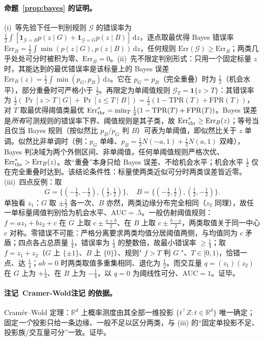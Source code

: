 \documentclass[fontset=windows,11pt]{ctexart}
\newcommand{\R}{\mathbb R}
\newcommand{\dd}{\,\mathrm d}
\numberwithin{equation}{section}
\begin{document}
\paragraph{命题~\ref{prop:bayes} 的证明。}
(i)~等先验下任一判别规则 $\mathcal G$ 的错误率为 $\tfrac12\int[\mathbf1_{\mathcal G=B}p(z\mid G)+\mathbf1_{\mathcal G=G}p(z\mid B)]\dd z$，逐点取最优得 Bayes 错误率 $\mathrm{Err}_B=\tfrac12\int\min(p(z\mid G),p(z\mid B))\dd z$，任何规则 $\mathrm{Err}(\mathcal G)\ge\mathrm{Err}_B$；两类几乎处处可分时被积为零、$\mathrm{Err}_B=0$。(ii)~先不限定判别形式：只用一个固定标量 $z$ 时，其能达到的最优错误率是该标量上的 Bayes 误差 $\mathrm{Err}_B(z)=\tfrac12\int\min(p_G,p_B)\dd z$。它在 $p_G=p_B$（完全重叠）时为 $\tfrac12$（机会水平），部分重叠时可严格小于 $\tfrac12$。再限定为单阈值规则 $\mathcal G_T=\mathbf1\{z>T\}$：其错误率为 $\tfrac12(\Pr[z>T\mid G]+\Pr[z\le T\mid B])=\tfrac12(1-\mathrm{TPR}(T)+\mathrm{FPR}(T))$，对 $T$ 取最优得阈值类最优 $\mathrm{Err}_{\rm thr}^*=\min_T\tfrac12(1-\mathrm{TPR}(T)+\mathrm{FPR}(T))$。Bayes 误差是\emph{所有}可测规则的错误率下界、阈值规则是其子类，故 $\mathrm{Err}_{\rm thr}^*\ge\mathrm{Err}_B(z)$；等号当且仅当 Bayes 规则（按似然比 $p_B/p_G$ 判 $B$）可表为单阈值，即似然比关于 $z$ 单调。似然比非单调时（例：$p_G$ 单峰、$p_B=\tfrac12N(-a,1)+\tfrac12N(a,1)$ 双峰），Bayes 判决域为两个外侧区间、非单阈值，任何单阈值规则严格次优、$\mathrm{Err}_{\rm thr}^*>\mathrm{Err}_B(z)$。故“重叠”本身只给 Bayes 误差、不给机会水平；机会水平 $\tfrac12$ 仅在完全重叠时达到。该结论条件性：标量使两类近似可分时两类误差皆近零。(iii)~四点反例：取
\[
G=\{(-\tfrac12,-\tfrac12),(\tfrac12,\tfrac12)\},\quad
B=\{(-\tfrac12,\tfrac12),(\tfrac12,-\tfrac12)\}.
\]
单独看 $z_1$：$G$ 取 $\pm\tfrac12$ 各一次、$B$ 亦然，两类边缘分布完全相同（$z_2$ 同理），故任一单标量阈值判别恰为机会水平、AUC$=.5$。一般仿射阈值规则：$f=az_1+bz_2+c$ 在 $G$ 上取 $c\pm\tfrac{a+b}{2}$、在 $B$ 上取 $c\pm\tfrac{b-a}{2}$，两类取值关于同一中心 $c$ 对称。零错误不可能：严格分离要求两类均值分居阈值两侧，与均值同为 $c$ 矛盾；四点各占总质量 $\tfrac14$，错误率为 $\tfrac14$ 的整数倍，故最小错误率 $\ge\tfrac14$；取 $f=z_1+z_2$（$G$ 上 $\{\pm1\}$、$B$ 上 $\{0\}$）、规则" $f>T$ 判 $G$ "、$T\in[0,1)$，恰错一点、达 $\tfrac14$；$ab=0$ 时两类取值多重集相同、退化为 $\tfrac12$。而交互量 $q=(z_1)(z_2)$ 在 $G$ 上为 $+\tfrac14$、在 $B$ 上为 $-\tfrac14$，以 $q=0$ 为阈线性可分、AUC$=1$。证毕。

\paragraph{注记~Cramer-Wold注记 的依据。}
Cramér--Wold 定理：$\R^d$ 上概率测度由其全部一维投影 $\{t^\top Z:t\in\R^d\}$ 唯一确定；固定\emph{一个}投影只给一条边缘、一般不足以区分两类，与 (iii) 的“固定单投影不足、投影族/交互量可分”一致。证毕。
\end{document}
